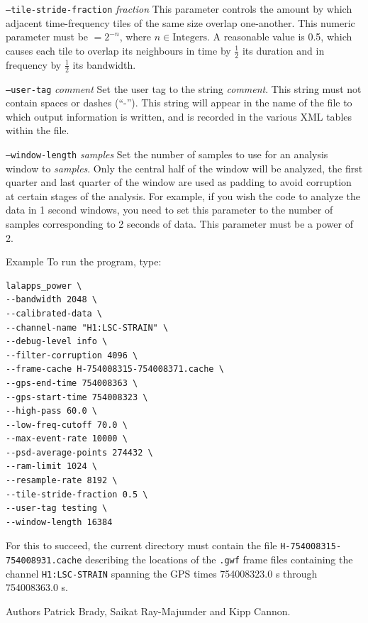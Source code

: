 \documentclass[10pt]{article}
\newcommand{\option}[1]{\texttt{#1}}
\newcommand{\parm}[1]{\textit{#1}}
\newenvironment{entry}%
{\begin{list}{}{\renewcommand{\makelabel}[1]%
{\parbox[b]{\labelwidth}{\makebox[0pt][l]{\textbf{##1}}\\}}%
\setlength{\labelwidth}{1em}%
\setlength{\labelsep}{1em}%
\setlength{\leftmargin}{2em}%
\setlength{\topsep}{\medskipamount}%
\setlength{\itemsep}{\medskipamount}%
\setlength{\parsep}{\medskipamount}%
\setlength{\listparindent}{0pt}}}
{\end{list}}
\begin{document}
\begin{entry}
\begin{entry}
\item[\option{--tile-stride-fraction} \parm{fraction}]
This parameter controls the amount by which adjacent time-frequency tiles
of the same size overlap one-another.  This numeric parameter must be \(=
2^{-n}\), where \(n \in \mathrm{Integers}\).  A reasonable value is 0.5,
which causes each tile to overlap its neighbours in time by \(\frac{1}{2}\)
its duration and in frequency by \(\frac{1}{2}\) its bandwidth.

\item[\option{--user-tag} \parm{comment}]
Set the user tag to the string \parm{comment}.  This string must not
contain spaces or dashes (``-'').  This string will appear in the name of
the file to which output information is written, and is recorded in the
various XML tables within the file.

\item[\option{--window-length} \parm{samples}]
Set the number of samples to use for an analysis window to \parm{samples}.
Only the central half of the window will be analyzed, the first quarter and
last quarter of the window are used as padding to avoid corruption at
certain stages of the analysis.  For example, if you wish the code to
analyze the data in 1 second windows, you need to set this parameter to the
number of samples corresponding to 2 seconds of data.  This parameter must
be a power of 2.

\end{entry}


\item[Example]
To run the program, type:
\begin{verbatim}
lalapps_power \
--bandwidth 2048 \
--calibrated-data \
--channel-name "H1:LSC-STRAIN" \
--debug-level info \
--filter-corruption 4096 \
--frame-cache H-754008315-754008371.cache \
--gps-end-time 754008363 \
--gps-start-time 754008323 \
--high-pass 60.0 \
--low-freq-cutoff 70.0 \
--max-event-rate 10000 \
--psd-average-points 274432 \
--ram-limit 1024 \
--resample-rate 8192 \
--tile-stride-fraction 0.5 \
--user-tag testing \
--window-length 16384
\end{verbatim}
For this to succeed, the current directory must contain the file
\texttt{H-754008315-754008931.cache} describing the locations of the
\texttt{.gwf} frame files containing the channel \verb|H1:LSC-STRAIN|
spanning the GPS times 754008323.0 s through 754008363.0 s.

\item[Authors]
Patrick Brady, Saikat Ray-Majumder and Kipp Cannon.  
\end{entry}
\end{document}
